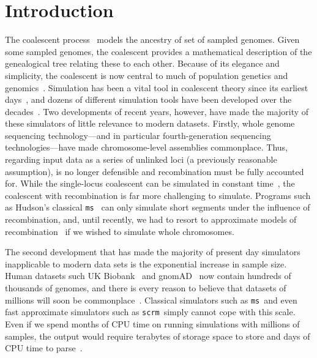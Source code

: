 \documentclass{article}
\newcommand{\ms}[0]{\texttt{ms}}
\newcommand{\scrm}[0]{\texttt{scrm}}
\newcommand{\ms}[0]{{\texttt{ms} }}
\newcommand{\scrm}[0]{{\texttt{scrm} }}
\begin{document}
\section*{Introduction}

The coalescent
process~\citep{kingman1982coalescent,hudson1983testing,tajima1983evolutionary}
models the ancestry of set of sampled genomes. Given some sampled
genomes, the coalescent provides a mathematical description of the
genealogical tree relating these to each other. Because of its
elegance and simplicity, the coalescent is now central to much of
population genetics and
genomics~\citep{hudson1990gene,hein2004gene,wakely2008coalescent}.
Simulation has been a vital
tool in coalescent theory since its earliest days~\citep{hudson1983testing},
and dozens of different simulation tools have been
developed over the decades~\citep{carvajal2008simulation,liu2008survey,
arenas2012simulation,yuan2012overview,hoban2012computer}.
Two developments of recent years, however, have made the majority
of these simulators of little relevance to modern datasets.
Firstly, whole genome sequencing technology---and in particular fourth-generation
sequencing technologies---have made chromosome-level assemblies
commonplace. Thus, regarding input data as a series of unlinked loci
(a previously reasonable assumption), is no longer defensible and
recombination must be fully accounted for. While the
single-locus coalescent can be simulated in constant
time~\citep{hudson1990gene}, the coalescent with recombination is
far more challenging to simulate.
Programs such as Hudson's classical \ms~\citep{hudson2002generating}
can only simulate short segments under the influence of recombination,
and, until recently, we had to resort to
approximate models of recombination~\citep{mcvean2005approximating,staab2014scrm}
if we wished to simulate whole chromosomes.

The second development that has made the majority of
present day simulators inapplicable to modern data sets is the
exponential increase in sample size. Human datasets such
UK Biobank~\citep{bycroft2018genome} and
gnomAD~\citep{karczewski2019variation} now contain hundreds of
thousands of genomes, and there is every reason to believe that
datasets of millions will soon be commonplace~\citep{stephens2015big}.
Classical simulators such as \ms\ and even fast approximate simulators
such as \scrm\ simply cannot cope with this scale. Even if we
spend months of CPU time on running simulations with millions of samples,
the output would require terabytes of storage space to store and
days of CPU time to parse~\citep{kelleher2016efficient}.
\end{document}
